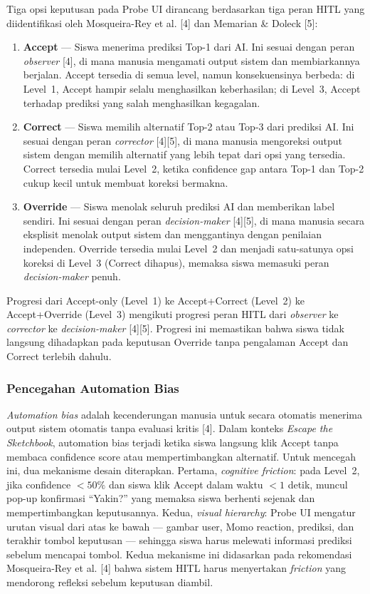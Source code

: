 Tiga opsi keputusan pada Probe UI dirancang berdasarkan tiga peran HITL yang diidentifikasi oleh Mosqueira-Rey et al. [4] dan Memarian \& Doleck [5]:

\begin{enumerate}
    \item \textbf{Accept} --- Siswa menerima prediksi Top-1 dari AI. Ini sesuai dengan peran \textit{observer} [4], di mana manusia mengamati output sistem dan membiarkannya berjalan. Accept tersedia di semua level, namun konsekuensinya berbeda: di Level~1, Accept hampir selalu menghasilkan keberhasilan; di Level~3, Accept terhadap prediksi yang salah menghasilkan kegagalan.
    \item \textbf{Correct} --- Siswa memilih alternatif Top-2 atau Top-3 dari prediksi AI. Ini sesuai dengan peran \textit{corrector} [4][5], di mana manusia mengoreksi output sistem dengan memilih alternatif yang lebih tepat dari opsi yang tersedia. Correct tersedia mulai Level~2, ketika confidence gap antara Top-1 dan Top-2 cukup kecil untuk membuat koreksi bermakna.
    \item \textbf{Override} --- Siswa menolak seluruh prediksi AI dan memberikan label sendiri. Ini sesuai dengan peran \textit{decision-maker} [4][5], di mana manusia secara eksplisit menolak output sistem dan menggantinya dengan penilaian independen. Override tersedia mulai Level~2 dan menjadi satu-satunya opsi koreksi di Level~3 (Correct dihapus), memaksa siswa memasuki peran \textit{decision-maker} penuh.
\end{enumerate}

Progresi dari Accept-only (Level~1) ke Accept+Correct (Level~2) ke Accept+Override (Level~3) mengikuti progresi peran HITL dari \textit{observer} ke \textit{corrector} ke \textit{decision-maker} [4][5]. Progresi ini memastikan bahwa siswa tidak langsung dihadapkan pada keputusan Override tanpa pengalaman Accept dan Correct terlebih dahulu.

\subsubsection{Pencegahan Automation Bias}

\textit{Automation bias} adalah kecenderungan manusia untuk secara otomatis menerima output sistem otomatis tanpa evaluasi kritis [4]. Dalam konteks \textit{Escape the Sketchbook}, automation bias terjadi ketika siswa langsung klik Accept tanpa membaca confidence score atau mempertimbangkan alternatif. Untuk mencegah ini, dua mekanisme desain diterapkan. Pertama, \textit{cognitive friction}: pada Level~2, jika confidence $< 50\%$ dan siswa klik Accept dalam waktu $< 1$ detik, muncul pop-up konfirmasi ``Yakin?'' yang memaksa siswa berhenti sejenak dan mempertimbangkan keputusannya. Kedua, \textit{visual hierarchy}: Probe UI mengatur urutan visual dari atas ke bawah --- gambar user, Momo reaction, prediksi, dan terakhir tombol keputusan --- sehingga siswa harus melewati informasi prediksi sebelum mencapai tombol. Kedua mekanisme ini didasarkan pada rekomendasi Mosqueira-Rey et al. [4] bahwa sistem HITL harus menyertakan \textit{friction} yang mendorong refleksi sebelum keputusan diambil.

